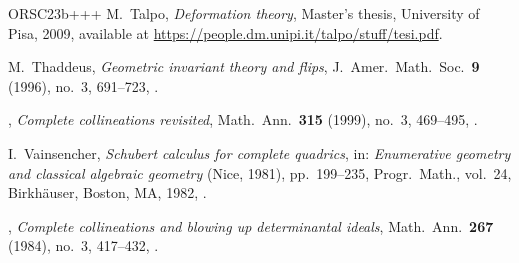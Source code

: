 \documentclass[11pt]{amsart}
\numberwithin{equation}{section}
\theoremstyle{definition}
\theoremstyle{remark}
\begin{document}
\begin{thebibliography}{ORSC\etalchar{+}23b+++}
M.~Talpo, 
\emph{Deformation theory}, 
Master's thesis, University of Pisa, 2009, available at \url{https://people.dm.unipi.it/talpo/stuff/tesi.pdf}.

M.~Thaddeus, 
\emph{Geometric invariant theory and flips}, 
J.~Amer.\ Math.\ Soc.\ \textbf{9} (1996), no.~3, 691--723,
.

\bysame, 
\emph{Complete collineations revisited}, 
Math.\ Ann.\ \textbf{315} (1999), no.~3, 469--495,
.

I.~Vainsencher, 
\emph{Schubert calculus for complete quadrics}, 
in: \emph{Enumerative geometry and classical algebraic geometry}
  ({N}ice, 1981),  pp.~199--235, Progr.\ Math., vol.~24, 
Birkh\"auser, Boston, MA, 1982,
.

  \bysame,
  \emph{Complete collineations and blowing up determinantal ideals}, 
  Math.\ Ann.\ \textbf{267} (1984), no.~3, 417--432,
  .

\end{thebibliography}
\end{document}
